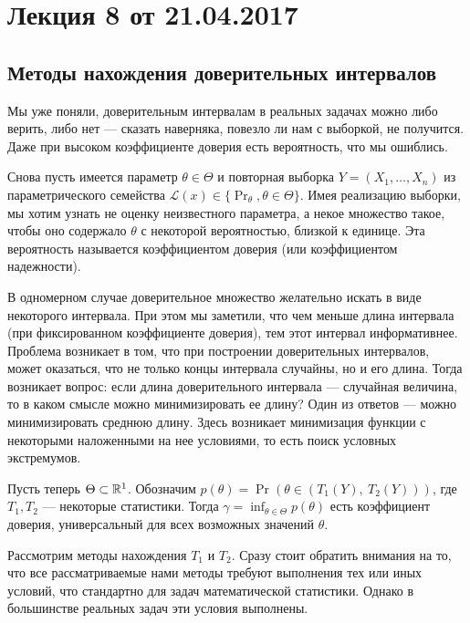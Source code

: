 \section{Лекция 8 от 21.04.2017}
\subsection{Методы нахождения доверительных интервалов}

Мы уже поняли, доверительным интервалам в реальных задачах можно либо верить, либо нет --- сказать наверняка, повезло ли нам с выборкой, не получится.
Даже при высоком коэффициенте доверия есть вероятность, что мы ошиблись.

Снова пусть имеется параметр $\theta \in \Theta$ и повторная выборка $Y = (X_1, \ldots, X_n)$ из параметрического семейства $\mathcal{L}(x) \in \{\Pr_\theta, \theta \in \Theta\}.$
Имея реализацию выборки, мы хотим узнать не оценку неизвестного параметра, а некое множество такое, чтобы оно содержало $\theta$ с некоторой вероятностью, близкой к единице. 
Эта вероятность называется коэффициентом доверия (или коэффициентом надежности). 

В одномерном случае доверительное множество желательно искать в виде некоторого интервала.
При этом мы заметили, что чем меньше длина интервала (при фиксированном коэффициенте доверия), тем этот интервал информативнее.
Проблема возникает в том, что при построении доверительных интервалов, может оказаться, что не только концы интервала случайны, но и его длина.
Тогда возникает вопрос: если длина доверительного интервала --- случайная величина, то в каком смысле можно минимизировать ее длину?
Один из ответов --- можно минимизировать среднюю длину. Здесь возникает минимизация функции с некоторыми наложенными на нее условиями, то есть поиск условных экстремумов.

Пусть теперь $\Theta \subset \mathbb{R}^1$. Обозначим $p(\theta) = \Pr\left(\theta \in (T_1(Y),\ T_2(Y))\right)$, где $T_1, T_2$ --- некоторые статистики.
Тогда $\gamma = \inf_{\theta \in \Theta} p(\theta)$ есть коэффициент доверия, универсальный для всех возможных значений $\theta$.

Рассмотрим методы нахождения $T_1$ и $T_2$.
Сразу стоит обратить внимания на то, что все рассматриваемые нами методы требуют выполнения тех или иных условий, что стандартно для задач математической статистики.
Однако в большинстве реальных задач эти условия выполнены.

